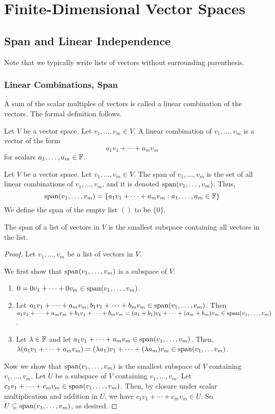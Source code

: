 \chapter{Finite-Dimensional Vector Spaces}
\section{Span and Linear Independence}
Note that we typically write lists of vectors without surrounding parenthesis.
\subsection*{Linear Combinations, Span}
A sum of the scalar multiples of vectors is called a linear combination of the vectors. The formal definition follows.
\begin{definition}
    Let $V$ be a vector space. Let $v_1, \dots, v_m \in V$. A linear combination of $v_1, \dots, v_m$ is a vector of the form
    \[ a_1v_1 + \cdots + a_mv_m\]
    for scalars $a_1, \dots, a_m \in \mathbb F$.
\end{definition}
\begin{definition}[Span]
    Let $V$ be a vector space. Let $v_1, \dots, v_m\in V$. The span of $v_1, \dots, v_m$ is the set of all linear combinations of $v_1, \dots, v_m$, and it is denoted $\operatorname{span}(v_1, \dots, v_m)$. Thus,
    \[ \operatorname{span}(v_1, \dots, v_m) = \{ a_1v_1 + \cdots + a_mv_m : a_1, \dots, a_m \in \mathbb F \} \]
    We define the span of the empty list $()$ to be $\{0\}$.
\end{definition}
\begin{theorem}
    The span of a list of vectors in $V$ is the smallest subspace containing all vectors in the list.
\end{theorem}
\begin{proof}
    Let $v_1, \dots, v_m$ be a list of vectors in $V$. 

    We first show that $\operatorname{span}(v_1, \dots, v_m)$ is a subspace of $V$. 
    \begin{enumerate}
        \item $0 = 0v_1 + \cdots + 0v_m\in \operatorname{span}(v_1, \dots, v_m)$. 
        \item Let $a_1v_1 + \cdots + a_mv_m, b_1v_1 + \cdots + b_mv_m\in \operatorname{span}(v_1, \dots, v_m)$. Then $a_1v_1 + \cdots + a_mv_m + b_1v_1 + \cdots + b_mv_m = (a_1+b_1)v_1 + \cdots + (a_m+b_m)v_m \in \operatorname{span}(v_1, \dots, v_m)$.
        \item Let $\lambda\in \mathbb F$ and let $a_1v_1 + \cdots + a_mv_m\in\operatorname{span}(v_1, \dots, v_m)$. Then, $\lambda(a_1v_1 + \cdots + a_mv_m) = (\lambda a_1)v_1 + \cdots + (\lambda a_m)v_m \in \operatorname{span}(v_1, \dots v_m)$.
    \end{enumerate}
    Now we show that $\operatorname{span}(v_1, \dots, v_m)$ is the smallest subspace of $V$ containing $v_1, \dots, v_m$. Let $U$ be a subspace of $V$ containing $v_1, \dots, v_m$. Let $c_1v_1 + \cdots + c_mv_m\in\operatorname{span}(v_1, \dots, v_m)$. Then, by closure under scalar multiplication and addition in $U$, we have $c_1v_1 + \cdots + c_mv_m \in U$. So $U\subseteq\operatorname{span}(v_1, \dots, v_m)$, as desired.
\end{proof}
